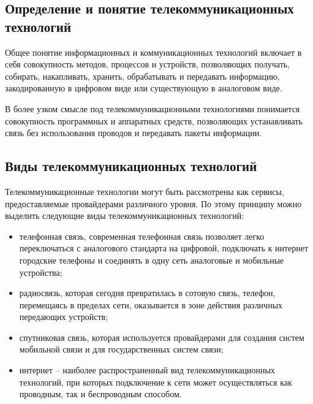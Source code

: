 \documentclass[a4paper]{report}
\begin{document}
\subsection{Определение и понятие телекоммуникационных \\ технологий}
Общее понятие информационных и коммуникационных технологий включает в себя совокупность методов, процессов и устройств, позволяющих получать, собирать, накапливать, хранить, обрабатывать и передавать информацию, закодированную в цифровом виде или существующую в аналоговом виде.
\par В более узком смысле под телекоммуникационными технологиями понимается совокупность программных и аппаратных средств, позволяющих устанавливать связь без использования проводов и передавать пакеты информации.

\subsection{Виды телекоммуникационных технологий}
Телекоммуникационные технологии могут быть рассмотрены как сервисы, предоставляемые провайдерами различного уровня.
По этому принципу можно выделить следующие виды телекоммуникационных технологий:
\begin{itemize}
\item телефонная связь, современная телефонная связь позволяет легко переключаться с аналогового стандарта на цифровой, подключать к интернет городские телефоны и соединять в одну сеть аналоговые и мобильные устройства;
\item радиосвязь, которая сегодня превратилась в сотовую связь, телефон, перемещаясь в пределах сети, оказывается в зоне действия различных передающих устройств;
\item спутниковая связь, которая используется провайдерами для создания систем мобильной связи и для государственных систем связи;
\item интернет – наиболее распространенный вид телекоммуникационных технологий, при которых подключение к сети может осуществляться как проводным, так и беспроводным способом.
\end{itemize}
\end{document}
